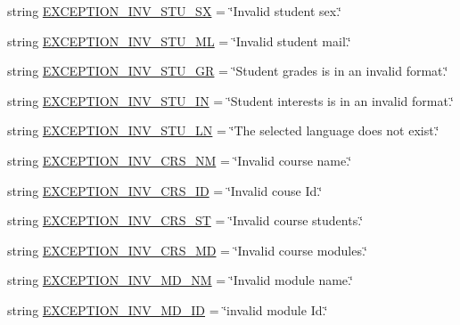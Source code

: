 \begin{DoxyCompactItemize}
string \hyperlink{namespaceELO_1_1lang_1_1en__us_a1c34be26129ea103c179e5ab44345618}{E\-X\-C\-E\-P\-T\-I\-O\-N\-\_\-\-I\-N\-V\-\_\-\-S\-T\-U\-\_\-\-S\-X} = \char`\"{}Invalid student sex.\char`\"{}
\item 
string \hyperlink{namespaceELO_1_1lang_1_1en__us_a06f50a4be7e9f81b7c352a29329f6dec}{E\-X\-C\-E\-P\-T\-I\-O\-N\-\_\-\-I\-N\-V\-\_\-\-S\-T\-U\-\_\-\-M\-L} = \char`\"{}Invalid student mail.\char`\"{}
\item 
string \hyperlink{namespaceELO_1_1lang_1_1en__us_a7c9746895ebba7899600f363e32bb4f2}{E\-X\-C\-E\-P\-T\-I\-O\-N\-\_\-\-I\-N\-V\-\_\-\-S\-T\-U\-\_\-\-G\-R} = \char`\"{}Student grades is in an invalid format.\char`\"{}
\item 
string \hyperlink{namespaceELO_1_1lang_1_1en__us_a04f9b7d18afda71928bfd235be6b811e}{E\-X\-C\-E\-P\-T\-I\-O\-N\-\_\-\-I\-N\-V\-\_\-\-S\-T\-U\-\_\-\-I\-N} = \char`\"{}Student interests is in an invalid format.\char`\"{}
\item 
string \hyperlink{namespaceELO_1_1lang_1_1en__us_af947c3185d86bea3370c3b0adc6f40c8}{E\-X\-C\-E\-P\-T\-I\-O\-N\-\_\-\-I\-N\-V\-\_\-\-S\-T\-U\-\_\-\-L\-N} = \char`\"{}The selected language does not exist.\char`\"{}
\item 
string \hyperlink{namespaceELO_1_1lang_1_1en__us_ae6fd750531db90516844d1d88e672142}{E\-X\-C\-E\-P\-T\-I\-O\-N\-\_\-\-I\-N\-V\-\_\-\-C\-R\-S\-\_\-\-N\-M} = \char`\"{}Invalid course name.\char`\"{}
\item 
string \hyperlink{namespaceELO_1_1lang_1_1en__us_a32fc4b8be31f4df0603eb88e3abc0e3f}{E\-X\-C\-E\-P\-T\-I\-O\-N\-\_\-\-I\-N\-V\-\_\-\-C\-R\-S\-\_\-\-I\-D} = \char`\"{}Invalid couse Id.\char`\"{}
\item 
string \hyperlink{namespaceELO_1_1lang_1_1en__us_ae121f29ddeb27bca1d4bcb9053144782}{E\-X\-C\-E\-P\-T\-I\-O\-N\-\_\-\-I\-N\-V\-\_\-\-C\-R\-S\-\_\-\-S\-T} = \char`\"{}Invalid course students.\char`\"{}
\item 
string \hyperlink{namespaceELO_1_1lang_1_1en__us_a10cbe6354215efdcb85294132cdedf4a}{E\-X\-C\-E\-P\-T\-I\-O\-N\-\_\-\-I\-N\-V\-\_\-\-C\-R\-S\-\_\-\-M\-D} = \char`\"{}Invalid course modules.\char`\"{}
\item 
string \hyperlink{namespaceELO_1_1lang_1_1en__us_a7e661b31292b8ce93cec536ab175d0a8}{E\-X\-C\-E\-P\-T\-I\-O\-N\-\_\-\-I\-N\-V\-\_\-\-M\-D\-\_\-\-N\-M} = \char`\"{}Invalid module name.\char`\"{}
\item 
string \hyperlink{namespaceELO_1_1lang_1_1en__us_a8d86d686c2421d91daf71fb5dc59a327}{E\-X\-C\-E\-P\-T\-I\-O\-N\-\_\-\-I\-N\-V\-\_\-\-M\-D\-\_\-\-I\-D} = \char`\"{}invalid module Id.\char`\"{}

\end{DoxyCompactItemize}
